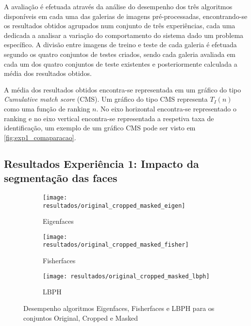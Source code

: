 A avaliação é efetuada através da análise do desempenho dos três algoritmos disponíveis em cada uma das galerias de imagens pré-processadas, encontrando-se os resultados obtidos agrupados num conjunto de três experiências, cada uma dedicada a analisar a variação do comportamento do sistema dado um problema específico. A divisão entre imagens de treino e teste de cada galeria é efetuada segundo os quatro conjuntos de testes criados, sendo cada galeria avaliada em cada um dos quatro conjuntos de teste existentes e posteriormente calculada a média dos resultados obtidos.

A média dos resultados obtidos encontra-se representada em um gráfico do tipo \textit{Cumulative match score} (CMS). Um gráfico do tipo CMS representa $T_{I}(n)$ como uma função de ranking $n$. No eixo horizontal encontra-se representado o ranking e no eixo vertical encontra-se representada a respetiva taxa de identificação, um exemplo de um gráfico CMS pode ser visto em \ref{fig:exp1_comaparacao}.

\subsection{Resultados Experiência 1: Impacto da segmentação das faces}

\begin{figure}[p]
        \centering
        \begin{subfigure}[b]{0.58\textwidth}
                \centering
                \texttt{[image: resultados/original\_cropped\_masked\_eigen]}
                \caption{Eigenfaces}
                \label{fig:original_cropped_masked_eigen}
        \end{subfigure}%

        \begin{subfigure}[b]{0.58\textwidth}
                \centering
                \texttt{[image: resultados/original\_cropped\_masked\_fisher]}
                \caption{Fisherfaces}
                \label{fig:original_cropped_masked_fisher}
        \end{subfigure}

        \begin{subfigure}[b]{0.58\textwidth}
                \centering
                \texttt{[image: resultados/original\_cropped\_masked\_lbph]}
                \caption{LBPH}
                \label{fig:original_cropped_masked_lbph}
        \end{subfigure}
        \caption{Desempenho algoritmos Eigenfaces, Fisherfaces e LBPH para os conjuntos Original, Cropped e Masked}
        \label{fig:original_cropped_masked}
\end{figure}

